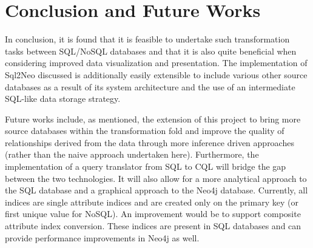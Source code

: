 \documentclass[12pt]{article}
\newcommand{\sectionfontstyle}{\fontsize{16pt}{1em}\usefont{T1}{phv}{b}{n}}
\begin{document}
    \newpage

    \section{\sectionfontstyle Conclusion and Future Works}
    In conclusion, it is found that it is feasible to undertake such transformation tasks between SQL/NoSQL databases and that it is also quite beneficial when considering improved data visualization and presentation. The implementation of Sql2Neo discussed is additionally easily extensible to include various other source databases as a result of its system architecture and the use of an intermediate SQL-like data storage strategy.

    Future works include, as mentioned, the extension of this project to bring more source databases within the transformation fold and improve the quality of relationships derived from the data through more inference driven approaches (rather than the naive approach undertaken here). Furthermore, the implementation of a query translator from SQL to CQL will bridge the gap between the two technologies. It will also allow for a more analytical approach to the SQL database and a graphical approach to the Neo4j database. Currently, all indices are single attribute indices and are created only on the primary key (or first unique value for NoSQL). An improvement would be to support composite attribute index conversion. These indices are present in SQL databases and can provide performance improvements in Neo4j as well.

    \newpage

    
    
\end{document}
